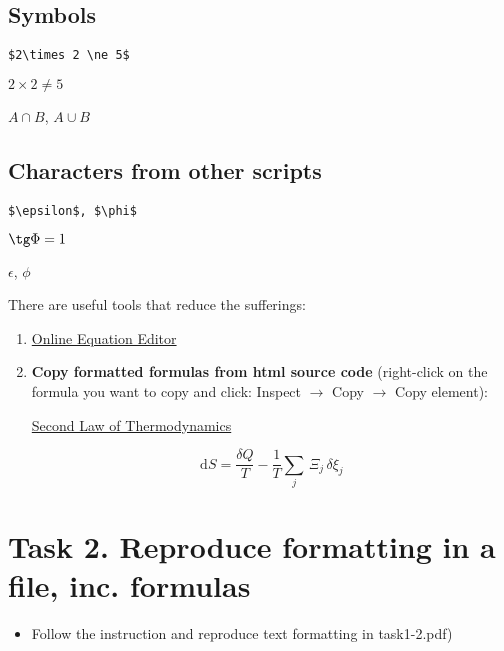 \documentclass[a4paper,11pt,leqno]{article}
\begin{document}
\subsection{Symbols}
\verb|$2\times 2 \ne 5$|

$2\times 2 \ne 5$

$A \cap B$, $A \cup B$

\subsection{Characters from other scripts}
\verb|$\epsilon$, $\phi$|

$\tg \Phi = 1$

$\epsilon$, $\phi$

\bigskip

There are useful tools that reduce the sufferings:

\begin{enumerate}
	\item \href{https://latexeditor.lagrida.com/}{Online Equation Editor} 
	\item \textbf{{\color{red}Copy formatted formulas from html source code}} (right-click on the formula you want to copy and click: Inspect $\rightarrow$ Copy $\rightarrow$ Copy element):
	
	\href{https://en.wikipedia.org/wiki/Second_law_of_thermodynamics}{Second Law of Thermodynamics}
	
	\[\mathrm {d} S={\frac {\delta Q}{T}}-{\frac {1}{T}}\sum _{j}\,\Xi _{j}\,\delta \xi _{j}\]
\end{enumerate}

\section*{Task 2. Reproduce formatting in a file, inc. formulas}
\label{task}

\begin{tcolorbox}[width=\textwidth, colback={yellow!40!white}, title={}, colbacktitle=yellow!60!white, coltitle=black]
	\begin{itemize}
		\item Follow the instruction and reproduce text formatting in task1-2.pdf)
	\end{itemize}
	
\end{tcolorbox}%
\end{document}
